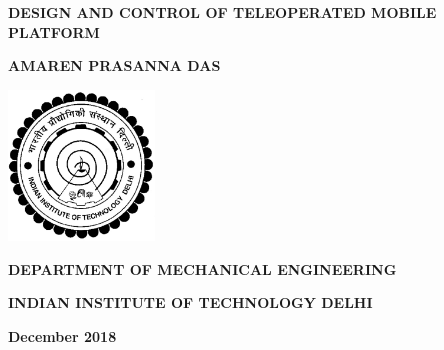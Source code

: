 \doublespacing
\thispagestyle{empty}
\begin{center}



\textbf{\large{DESIGN AND CONTROL OF TELEOPERATED MOBILE PLATFORM}}

\bigskip
\bigskip
\bigskip
\bigskip
\bigskip
\bigskip
\bigskip
\bigskip
\bigskip
\bigskip

\textbf{AMAREN PRASANNA DAS}

\bigskip
\bigskip
\bigskip
\bigskip
\bigskip
\bigskip
\bigskip
\bigskip
\bigskip
\bigskip
\bigskip
\bigskip
\bigskip
\bigskip
\bigskip
\bigskip
\bigskip
\bigskip
\bigskip
\bigskip
\bigskip

\includegraphics[height=4cm]{Misc_front/iitlogo.eps}

\bigskip
\bigskip
\bigskip
\bigskip
\bigskip
\bigskip

\textbf{DEPARTMENT OF MECHANICAL ENGINEERING}

\textbf{INDIAN INSTITUTE OF TECHNOLOGY DELHI}

\textbf{December 2018}



\end{center}
\newpage
\thispagestyle{empty}
\mbox{}

